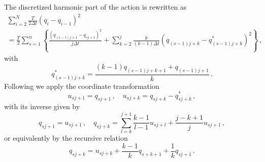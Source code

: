 \documentclass[11pt, a4paper]{article}
\newcommand{\bt}{\pmb\theta}
\begin{document}
The discretized harmonic part of the action is rewritten as
\begin{multline}
  \sum_{i=2}^{N}
  \frac{T}{2\Delta t}
  (q_i-q_{i-1})^2
  \\ =
  \frac{T}{2}
  \sum_{s=1}^{n}\left\{
    \frac{(q_{(s-1)j+1} - q_{sj+1})^2}{j\Delta t}
    +
    \sum_{k=2}^j
    \frac{k}{(k-1)\Delta t}
    (q_{(s-1)j+k}-q^*_{(s-1)j+k})^2
  \right\}\,,
\end{multline}
with
\begin{equation}
  q^*_{(s-1)j+k}
  =
  \frac{(k-1)q_{(s-1)j+k+1} + q_{(s-1)j+1} }{k}
  \,.
\end{equation}
Following \cite{tuckerman1993efficient} we apply the coordinate transformation
\begin{equation}
  u_{sj+1} = q_{sj+1}\,,\quad
  u_{sj+k} = q_{sj+k} - q^*_{sj+k}\,,
\end{equation}
with its inverse given by
\begin{equation}
  q_{sj+1} = u_{sj+1}\,,\quad
  q_{sj+k} = \sum_{l=k}^{j+1}\frac{k-1}{l-1}u_{sj+l}
  +\frac{j-k+1}{j}u_{sj+1}\,,
\end{equation}
or equivalently by the recursive relation
\begin{equation}
  q_{sj+k} = u_{sj+k} + \frac{k-1}{k} q_{s+k+1}+ \frac{1}{k}q_{sj+1} \,.
\end{equation}
%
%
%
\end{document}
